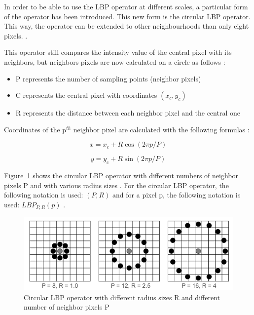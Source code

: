\vspace{\baselineskip}
\noindent In order to be able to use the LBP operator at different scales, a particular form of the operator has been introduced. This new form is the circular LBP operator. This way, the operator can be extended to other neighbourhoods than only eight pixels. \cite{GAN08}.
\newline

\noindent This operator still compares the intensity value of the central pixel with its neighbors, but neighbors pixels are now calculated on a circle as follows \cite{GAN08}:

\begin{itemize}
  \item P represents the number of sampling points (neighbor pixels)
  \item C represents the central pixel with coordinates $ (x_c,y_c) $
  \item R represents the distance between each neighbor pixel and the central one
\end{itemize}

\noindent Coordinates of the p$^{th}$ neighbor pixel are calculated with the following formulas \cite{JUL07}:
\newline

\begin{equation}
   x = x_c + R\cos(2\pi p/P)
\end{equation}

\begin{equation}
   y = y_c + R\sin(2\pi p/P)
\end{equation}

\vspace{\baselineskip}
\noindent Figure~\ref{lbp_circular_operator} shows the circular LBP operator with different numbers of neighbor pixels P and with various radius sizes \cite{JUL07}. For the circular LBP operator, the following notation is used: $ (P,R) $ and for a pixel p, the following notation is used: $ LBP_{P,R}(p) $ \cite{GAN08}.
\newline

\begin{figure}[!h]
\begin{center}
\noindent \includegraphics[scale=0.5]{figures/lbp_circular_operator} 
\newline
\caption{Circular LBP operator with different radius sizes R and different number of neighbor pixels P}
\label{lbp_circular_operator}
\end{center} 
\end{figure}

